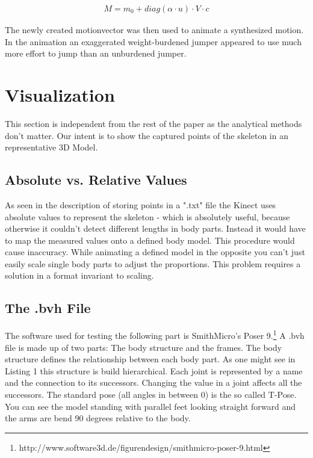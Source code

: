 \documentclass[a4paper]{article}
\begin{document}
\begin{align}
	M = m_0 + diag(\alpha \cdot u) \cdot V \cdot c \label{eq:synthesis}
\end{align}

The newly created motionvector was then used to animate a synthesized motion.
In the animation an exaggerated weight-burdened jumper appeared to use much more effort to jump than an unburdened jumper.

\section{Visualization}

This section is independent from the rest of the paper as the analytical methods don't matter.
Our intent is to show the captured points of the skeleton in an representative 3D Model.

\subsection{Absolute vs. Relative Values}

As seen in the description of storing points in a ".txt" file the Kinect uses absolute values to represent the skeleton  - which is absolutely useful, because otherwise it couldn't detect different lengths in body parts.
Instead it would have to map the measured values onto a defined body model.
This procedure would cause inaccuracy.
While animating a defined model in the opposite you can't just easily scale single body parts to adjust the proportions.
This problem requires a solution in a format invariant to scaling.

\subsection{The .bvh File}

The software used for testing the following part is SmithMicro's Poser 9.\footnote{http://www.software3d.de/figurendesign/smithmicro-poser-9.html}
A .bvh file is made up of two parts: The body structure and the frames.
The body structure defines the relationship between each body part.
As one might see in Listing 1 this structure is build hierarchical.
Each joint is represented by a name and the connection to its successors.
Changing the value in a joint affects all the successors. 
The standard pose (all angles in between 0) is the so called T-Pose.
You can see the model standing with parallel feet looking straight forward and the arms are bend 90 degrees relative to the body.
\end{document}
